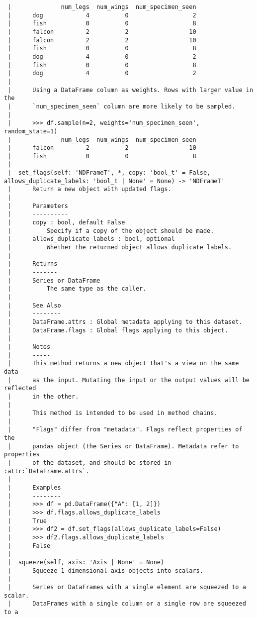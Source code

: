 \documentclass[
  letterpaper,
  DIV=11,
  numbers=noendperiod]{scrreprt}
\begin{document}
\begin{verbatim}
 |              num_legs  num_wings  num_specimen_seen
 |      dog            4          0                  2
 |      fish           0          0                  8
 |      falcon         2          2                 10
 |      falcon         2          2                 10
 |      fish           0          0                  8
 |      dog            4          0                  2
 |      fish           0          0                  8
 |      dog            4          0                  2
 |      
 |      Using a DataFrame column as weights. Rows with larger value in the
 |      `num_specimen_seen` column are more likely to be sampled.
 |      
 |      >>> df.sample(n=2, weights='num_specimen_seen', random_state=1)
 |              num_legs  num_wings  num_specimen_seen
 |      falcon         2          2                 10
 |      fish           0          0                  8
 |  
 |  set_flags(self: 'NDFrameT', *, copy: 'bool_t' = False, allows_duplicate_labels: 'bool_t | None' = None) -> 'NDFrameT'
 |      Return a new object with updated flags.
 |      
 |      Parameters
 |      ----------
 |      copy : bool, default False
 |          Specify if a copy of the object should be made.
 |      allows_duplicate_labels : bool, optional
 |          Whether the returned object allows duplicate labels.
 |      
 |      Returns
 |      -------
 |      Series or DataFrame
 |          The same type as the caller.
 |      
 |      See Also
 |      --------
 |      DataFrame.attrs : Global metadata applying to this dataset.
 |      DataFrame.flags : Global flags applying to this object.
 |      
 |      Notes
 |      -----
 |      This method returns a new object that's a view on the same data
 |      as the input. Mutating the input or the output values will be reflected
 |      in the other.
 |      
 |      This method is intended to be used in method chains.
 |      
 |      "Flags" differ from "metadata". Flags reflect properties of the
 |      pandas object (the Series or DataFrame). Metadata refer to properties
 |      of the dataset, and should be stored in :attr:`DataFrame.attrs`.
 |      
 |      Examples
 |      --------
 |      >>> df = pd.DataFrame({"A": [1, 2]})
 |      >>> df.flags.allows_duplicate_labels
 |      True
 |      >>> df2 = df.set_flags(allows_duplicate_labels=False)
 |      >>> df2.flags.allows_duplicate_labels
 |      False
 |  
 |  squeeze(self, axis: 'Axis | None' = None)
 |      Squeeze 1 dimensional axis objects into scalars.
 |      
 |      Series or DataFrames with a single element are squeezed to a scalar.
 |      DataFrames with a single column or a single row are squeezed to a

\end{verbatim}
\end{document}
